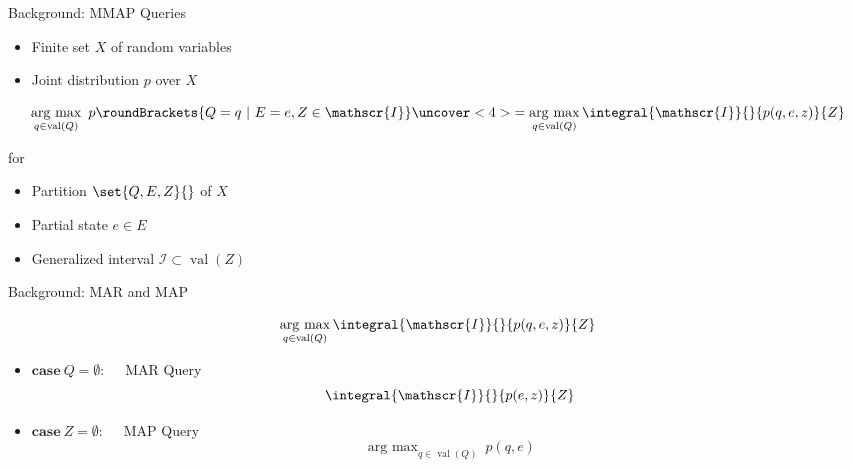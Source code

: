 \documentclass[aspectratio=169]{beamer}
\DeclareMathOperator*{\argmax}{arg\ max}
\DeclareMathOperator{\val}{val}
\begin{document}
  \begin{frame}{Background: MMAP Queries}
    \begin{itemize}
      \item<1-> Finite set $X$ of random variables
      \item<1-> Joint distribution $p$ over $X$
    \end{itemize}
    \begin{mybox}
      \[
        \argmax_{q\in\val(Q)} \ p\roundBrackets{Q=q \ | \ E=e,Z\in\mathscr{I}}
        \uncover<4>{ = \argmax_{q\in\val(Q)} \integral{\mathscr{I}}{}{p(q,e,z)}{Z} }
      \]
    \end{mybox}
    for
    \begin{itemize}
      \item<3-> Partition $\set{Q,E,Z}{}$ of $X$
      \item<3-> Partial state $e\in E$
      \item<3-> Generalized interval $\mathscr{I}\subset\val(Z)$
    \end{itemize}
  \end{frame}

  \begin{frame}{Background: MAR and MAP}
    \begin{mybox}
      \[
        \argmax_{q\in\val(Q)} \integral{\mathscr{I}}{}{p(q,e,z)}{Z}
      \]
    \end{mybox}
    \onslide<+->
    \begin{itemize}
      \item<+-> $\mathbf{case}\ Q=\emptyset :\quad $ MAR Query
      \[
        \integral{\mathscr{I}}{}{p(e,z)}{Z}
      \]
      \item<+-> $\mathbf{case}\ Z=\emptyset :\quad $ MAP Query
      \[
        \argmax_{q\in\val(Q)}\ p(q,e)
      \]
    \end{itemize}
  \end{frame}
\end{document}
